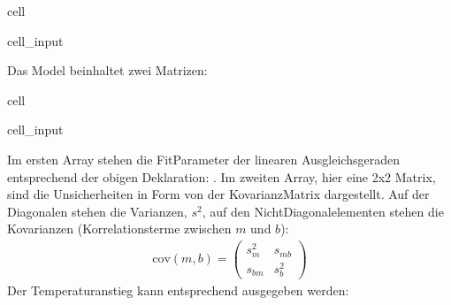 \documentclass[letterpaper,10pt,english]{jupyterBook}
\begin{document}
\begin{sphinxuseclass}{cell}
\begin{sphinxVerbatimInput}
\begin{sphinxuseclass}{cell_input}
\end{sphinxuseclass}\end{sphinxVerbatimInput}

\end{sphinxuseclass}
\sphinxAtStartPar
Das Model beinhaltet zwei Matrizen:

\begin{sphinxuseclass}{cell}\begin{sphinxVerbatimInput}

\begin{sphinxuseclass}{cell_input}
\begin{sphinxVerbatim}[commandchars=\\\{\}]
\end{sphinxVerbatim}

\end{sphinxuseclass}\end{sphinxVerbatimInput}

\end{sphinxuseclass}
\sphinxAtStartPar
Im ersten Array stehen die Fit\sphinxhyphen{}Parameter der linearen Ausgleichsgeraden entsprechend der obigen Deklaration: .
Im zweiten Array, hier eine 2x2 Matrix, sind die Unsicherheiten in Form von der Kovarianz\sphinxhyphen{}Matrix dargestellt. Auf der Diagonalen stehen die Varianzen, \(s^2\), auf den Nicht\sphinxhyphen{}Diagonalelementen stehen die Kovarianzen (Korrelationsterme zwischen \(m\) und \(b\)):
\begin{equation*}
\begin{split}\mathrm{cov}(m,b) = 
\begin{pmatrix}
 s_m^2 & s_{mb} \\
 s_{bm} & s_b^2
\end{pmatrix} \end{split}
\end{equation*}
\sphinxAtStartPar
Der Temperaturanstieg kann entsprechend ausgegeben werden:
\end{document}
